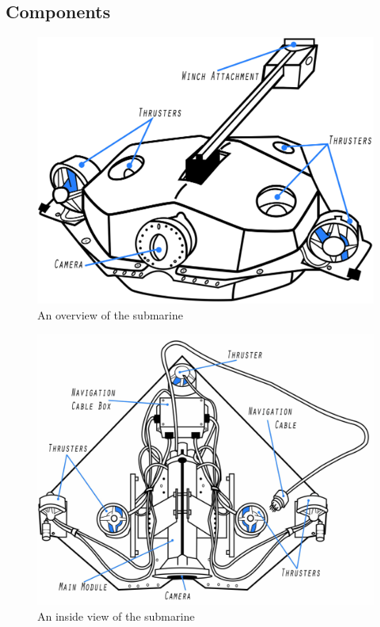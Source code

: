 \documentclass[
10pt, %
a4paper, %
oneside, %
headinclude,footinclude, %
BCOR5mm, %
]{scrartcl}
\begin{document}
\subsection{Components}
\begin{figure}[H]
	\centering 
	\includegraphics[width=0.9\linewidth]{Figures/Component_Diagrams/basic_sub.jpg}
	\caption[]{An overview of the submarine} %
\end{figure}
\begin{figure}[H]
	\centering 
	\includegraphics[width=0.9\columnwidth]{Figures/Component_Diagrams/inside_sub.jpg}
	\caption[]{An inside view of the submarine} %
\end{figure}
\end{document}
